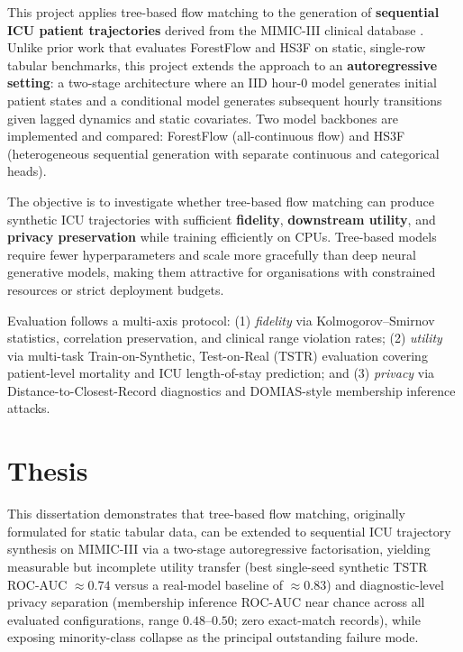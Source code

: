 \documentclass[11pt]{informatics-report}
\begin{document}
This project applies tree-based flow matching to the generation of \textbf{sequential ICU patient trajectories} derived from the MIMIC-III clinical database \cite{johnson2016mimic}. Unlike prior work that evaluates ForestFlow and HS3F on static, single-row tabular benchmarks, this project extends the approach to an \textbf{autoregressive setting}: a two-stage architecture where an IID hour-0 model generates initial patient states and a conditional model generates subsequent hourly transitions given lagged dynamics and static covariates. Two model backbones are implemented and compared: ForestFlow (all-continuous flow) and HS3F (heterogeneous sequential generation with separate continuous and categorical heads).

The objective is to investigate whether tree-based flow matching can produce synthetic ICU trajectories with sufficient \textbf{fidelity}, \textbf{downstream utility}, and \textbf{privacy preservation} while training efficiently on CPUs. Tree-based models require fewer hyperparameters and scale more gracefully than deep neural generative models, making them attractive for organisations with constrained resources or strict deployment budgets.

Evaluation follows a multi-axis protocol: (1) \emph{fidelity} via Kolmogorov--Smirnov statistics, correlation preservation, and clinical range violation rates; (2) \emph{utility} via multi-task Train-on-Synthetic, Test-on-Real (TSTR) evaluation covering patient-level mortality and ICU length-of-stay prediction; and (3) \emph{privacy} via Distance-to-Closest-Record diagnostics and DOMIAS-style membership inference attacks.

\section{Thesis}

This dissertation demonstrates that tree-based flow matching, originally formulated for static tabular data, can be extended to sequential ICU trajectory synthesis on MIMIC-III via a two-stage autoregressive factorisation, yielding measurable but incomplete utility transfer (best single-seed synthetic TSTR ROC-AUC $\approx 0.74$ versus a real-model baseline of $\approx 0.83$) and diagnostic-level privacy separation (membership inference ROC-AUC near chance across all evaluated configurations, range $0.48$--$0.50$; zero exact-match records), while exposing minority-class collapse as the principal outstanding failure mode.
\end{document}
